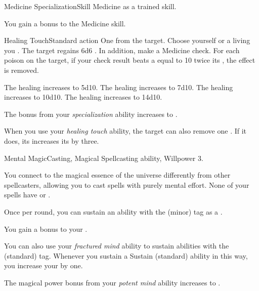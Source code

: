  \begin{feat}{Medicine Specialization}{Skill}
    \featpre Medicine as a trained skill.

     You gain a  bonus to the Medicine skill.

    \begin{activeability}{Healing Touch}{Standard action}
      \abilitytags {}
      \abilitycost One  from the target.
      \rankline
      Choose yourself or a living  you .
      The target regains 6d6 .
      In addition, make a Medicine check.
      For each poison on the target, if your check result beats a  equal to 10 \add twice its , the effect is removed.

      \rankline
       The healing increases to 5d10.
       The healing increases to 7d10.
       The healing increases to 10d10.
       The healing increases to 14d10.
    \end{activeability}

     The bonus from your \textit{specialization} ability increases to .

     When you use your \textit{healing touch} ability, the target can also remove one .
    If it does, its increases its  by three.
  \end{feat}

  \begin{magicalfeat}{Mental Magic}{Casting, Magical}
    \featpre Spellcasting ability, Willpower 3.

     You connect to the magical essence of the universe differently from other spellcasters, allowing you to cast spells with purely mental effort.
    None of your spells have  or .

     Once per round, you can sustain an ability with the  (minor) tag as a .

     You gain a  bonus to your .

     You can also use your \textit{fractured mind} ability to sustain abilities with the  (standard) tag.
    Whenever you sustain a Sustain (standard) ability in this way, you increase your  by one.

     The magical power bonus from your \textit{potent mind} ability increases to .
  \end{magicalfeat}

